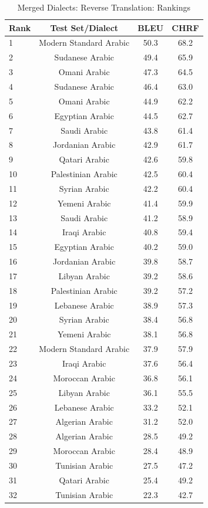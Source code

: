 \begin{table}[htbp]
\centering
\caption{Merged Dialects: Reverse Translation: Rankings}
\label{tab:testset_ranking_reverse_merged}
\begin{tabular}{l@{\hspace{3pt}}c@{\hspace{3pt}}c@{\hspace{3pt}}c}
\toprule
Rank & Test Set/Dialect & BLEU & CHRF \\
\midrule
1 & Modern Standard Arabic  & 50.3 & 68.2 \\
2 & Sudanese Arabic  & 49.4 & 65.9 \\
3 & Omani Arabic  & 47.3 & 64.5 \\
4 & Sudanese Arabic & 46.4 & 63.0 \\
5 & Omani Arabic & 44.9 & 62.2 \\
6 & Egyptian Arabic  & 44.5 & 62.7 \\
7 & Saudi Arabic  & 43.8 & 61.4 \\
8 & Jordanian Arabic  & 42.9 & 61.7 \\
9 & Qatari Arabic  & 42.6 & 59.8 \\
10 & Palestinian Arabic  & 42.5 & 60.4 \\
11 & Syrian Arabic  & 42.2 & 60.4 \\
12 & Yemeni Arabic  & 41.4 & 59.9 \\
13 & Saudi Arabic & 41.2 & 58.9 \\
14 & Iraqi Arabic  & 40.8 & 59.4 \\
15 & Egyptian Arabic & 40.2 & 59.0 \\
16 & Jordanian Arabic & 39.8 & 58.7 \\
17 & Libyan Arabic  & 39.2 & 58.6 \\
18 & Palestinian Arabic & 39.2 & 57.2 \\
19 & Lebanese Arabic  & 38.9 & 57.3 \\
20 & Syrian Arabic & 38.4 & 56.8 \\
21 & Yemeni Arabic & 38.1 & 56.8 \\
22 & Modern Standard Arabic & 37.9 & 57.9 \\
23 & Iraqi Arabic & 37.6 & 56.4 \\
24 & Moroccan Arabic  & 36.8 & 56.1 \\
25 & Libyan Arabic & 36.1 & 55.5 \\
26 & Lebanese Arabic & 33.2 & 52.1 \\
27 & Algerian Arabic  & 31.2 & 52.0 \\
28 & Algerian Arabic & 28.5 & 49.2 \\
29 & Moroccan Arabic & 28.4 & 48.9 \\
30 & Tunisian Arabic  & 27.5 & 47.2 \\
31 & Qatari Arabic & 25.4 & 49.2 \\
32 & Tunisian Arabic & 22.3 & 42.7 \\
\bottomrule
\end{tabular}
\end{table}